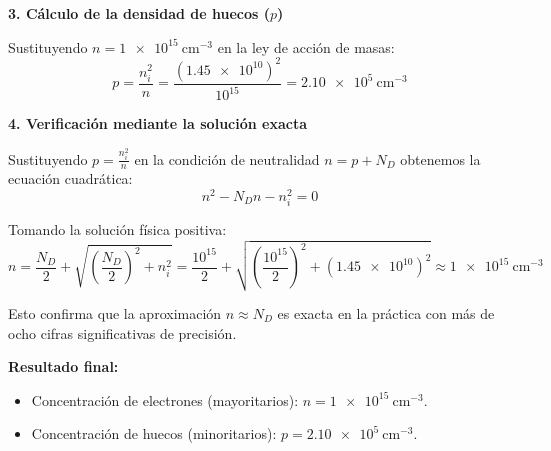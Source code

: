\begin{problema}
\textbf{3. Cálculo de la densidad de huecos ($p$)}

Sustituyendo $n = \SI{1e15}{\cm^{-3}}$ en la ley de acción de masas:
\[
p = \frac{n_i^2}{n} = \frac{(\num{1.45e10})^2}{10^{15}} = \SI{2.10e5}{\cm^{-3}}
\]

\textbf{4. Verificación mediante la solución exacta}

Sustituyendo $p = \frac{n_i^2}{n}$ en la condición de neutralidad $n = p + N_D$ obtenemos la ecuación cuadrática:
\[
n^2 - N_D n - n_i^2 = 0
\]

Tomando la solución física positiva:
\[
n = \frac{N_D}{2} + \sqrt{\left(\frac{N_D}{2}\right)^2 + n_i^2} = \frac{10^{15}}{2} + \sqrt{\left(\frac{10^{15}}{2}\right)^2 + (\num{1.45e10})^2} \approx \SI{1e15}{\cm^{-3}}
\]

Esto confirma que la aproximación $n \approx N_D$ es exacta en la práctica con más de ocho cifras significativas de precisión.

\textbf{Resultado final:}
\begin{itemize}
    \item Concentración de electrones (mayoritarios): $n = \SI{1e15}{\cm^{-3}}$.
    \item Concentración de huecos (minoritarios): $p = \SI{2.10e5}{\cm^{-3}}$.
\end{itemize}
\end{problema}

